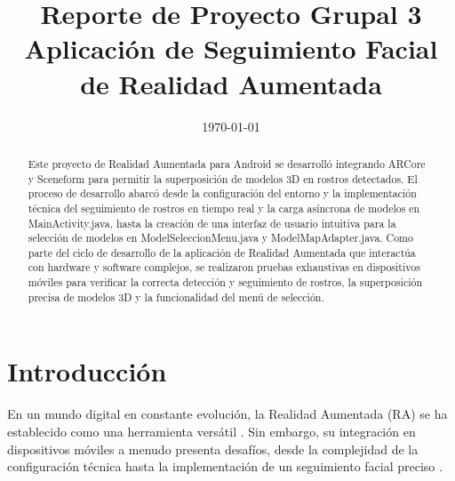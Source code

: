 \documentclass[conference]{IEEEtran}
\date{\specialdate\today}
\begin{document}
\newcommand{\breite}{0.9} %
\newcommand{\RelacionFiguradoscolumnas}{0.9}
\newcommand{\RelacionFiguradoscolumnasPuntoCinco}{0.45}



\title{Reporte de Proyecto Grupal 3 \\Aplicación de Seguimiento Facial de Realidad Aumentada}

\author{
}
\maketitle



\begin{abstract} 

    Este proyecto de Realidad Aumentada para Android se desarrolló integrando ARCore y Sceneform para permitir la superposición de modelos 3D en rostros detectados. El proceso de desarrollo abarcó desde la configuración del entorno y la implementación técnica del seguimiento de rostros en tiempo real y la carga asíncrona de modelos en MainActivity.java, hasta la creación de una interfaz de usuario intuitiva para la selección de modelos en ModelSeleccionMenu.java y ModelMapAdapter.java. Como parte del ciclo de desarrollo de la aplicación de Realidad Aumentada que interactúa con hardware y software complejos, se realizaron pruebas exhaustivas en dispositivos móviles para verificar la correcta detección y seguimiento de rostros, la superposición precisa de modelos 3D y la funcionalidad del menú de selección.

\end{abstract}

\section{Introducción}
    En un mundo digital en constante evolución, la Realidad Aumentada (RA) se ha establecido como una herramienta versátil \cite{cadavieco2012realidad}. Sin embargo, su integración en dispositivos móviles a menudo presenta desafíos, desde la complejidad de la configuración técnica hasta la implementación de un seguimiento facial preciso \cite{bernal2018analisis}.
\end{document}
